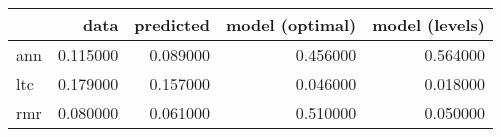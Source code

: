 \begin{tabular}{lrrrr}
\toprule
 & data & predicted & model (optimal) & model (levels) \\
\midrule
ann & 0.115000 & 0.089000 & 0.456000 & 0.564000 \\
ltc & 0.179000 & 0.157000 & 0.046000 & 0.018000 \\
rmr & 0.080000 & 0.061000 & 0.510000 & 0.050000 \\
\bottomrule
\end{tabular}
